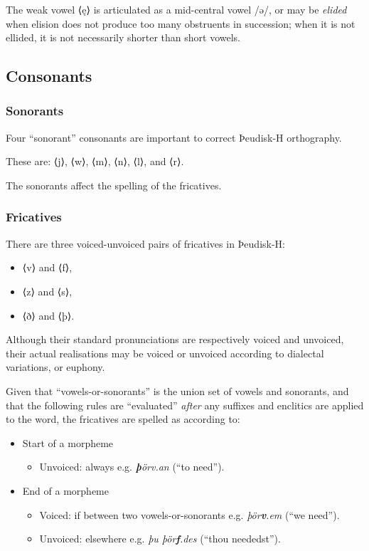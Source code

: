 The weak vowel ⟨ę⟩ is articulated as a mid-central vowel /ə/, or may be \emph{elided} when elision does not produce too many obstruents in succession; when it is not ellided, it is not necessarily shorter than short vowels.

\subsection{Consonants}

\subsubsection{Sonorants}

Four ``sonorant'' consonants are important to correct Þeudisk-H orthography.

These are: ⟨j⟩, ⟨w⟩, ⟨m⟩, ⟨n⟩, ⟨l⟩, and ⟨r⟩.

The sonorants affect the spelling of the fricatives.

\subsubsection{Fricatives}

There are three voiced-unvoiced pairs of fricatives in Þeudisk-H:

\begin{itemize}
\item ⟨v⟩ and ⟨f⟩,
\item ⟨z⟩ and ⟨s⟩,
\item ⟨ð⟩ and ⟨þ⟩.
\end{itemize}

Although their standard pronunciations are respectively voiced and unvoiced,
their actual realisations may be voiced or unvoiced according to dialectal
variations, or euphony.

Given that ``vowels-or-sonorants'' is the union set of vowels and sonorants, and that the following rules are ``evaluated'' \textit{after} any suffixes and enclitics are applied to the word, the fricatives are spelled as according to:

\begin{itemize}
\item Start of a morpheme
    \begin{itemize}
    \item Unvoiced: always e.g. \textit{\textbf{þ}örv.an} (``to need'').
    \end{itemize}
\item End of a morpheme
    \begin{itemize}
    \item Voiced: if between two vowels-or-sonorants e.g. \textit{þör\textbf{v}.em} (``we need'').
    \item Unvoiced: elsewhere e.g. \textit{þu þör\textbf{f}.des} (``thou neededst'').
    \end{itemize}
\end{itemize}
